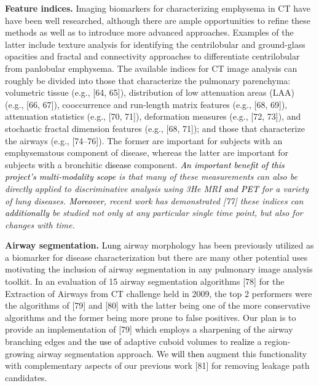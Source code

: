 \documentclass[11pt,]{article}
\begin{document}
\textbf{Feature indices.} Imaging biomarkers for characterizing
emphysema in CT have have been well researched, although there are ample
opportunities to refine these methods as well as to introduce more
advanced approaches. Examples of the latter include texture analysis for
identifying the centrilobular and ground-glass opacities and fractal and
connectivity approaches to differentiate centrilobular from panlobular
emphysema. The available indices for CT image analysis can roughly be
divided into those that characterize the pulmonary parenchyma:
volumetric tissue (e.g., {[}64, 65{]}), distribution of low attenuation
areas (LAA) (e.g., {[}66, 67{]}), cooccurrence and run-length matrix
features (e.g., {[}68, 69{]}), attenuation statistics (e.g., {[}70,
71{]}), deformation measures (e.g., {[}72, 73{]}), and stochastic
fractal dimension features (e.g., {[}68, 71{]}); and those that
characterize the airways (e.g., {[}74--76{]}). The former are important
for subjects with an emphysematous component of disease, whereas the
latter are important for subjects with a bronchitic
\textcolor{black}{disease} component.
\emph{\textcolor{black}{An important benefit of this
project's multi-modality scope} is that many of these measurements can
also be directly applied to discriminative analysis using 3He MRI
\textcolor{black}{and PET} for a variety of lung diseases.
\textcolor{black}{Moreover}, recent work has demonstrated {[}77{]} these
indices can \textcolor{black}{additionally} be studied not only at any
particular single time point, but also for changes with time.}

\textbf{Airway segmentation.} \textcolor{black}{Lung} airway morphology
has been previously utilized as a biomarker for disease characterization
but there are many other potential uses motivating the inclusion of
airway segmentation in any pulmonary image analysis toolkit. In an
evaluation of 15 airway segmentation algorithms {[}78{]} for the
Extraction of Airways from CT challenge held in 2009, the top 2
performers were the algorithms of {[}79{]} and {[}80{]} with the latter
being one of the more conservative algorithms and the former being more
prone to false positives. Our plan is to provide an implementation of
{[}79{]} which employs a sharpening of the airway branching edges and
\textcolor{black}{the use of} adaptive cuboid volumes to
\textcolor{black}{realize} a region-growing airway segmentation
approach. We \textcolor{black}{will then} augment this functionality
with complementary aspects of our previous work {[}81{]} for removing
leakage path candidates.
\end{document}
